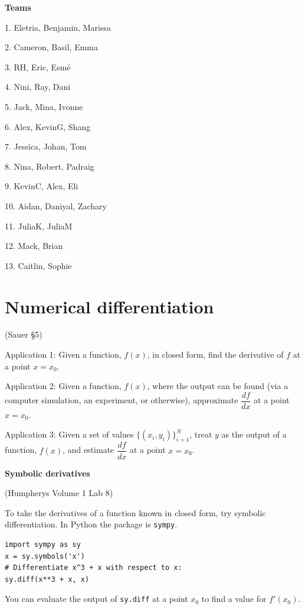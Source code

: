 \documentclass[12pt,letterpaper,noanswers]{exam}
\begin{document}
\noindent \textbf{Teams}
\begin{multicols}{3}
1. Eletria, Benjamin, Marissa

2. Cameron, Basil, Emma

3. RH, Eric, Esmé

4. Nini, Ray, Dani

5. Jack, Mina, Ivonne

6. Alex, KevinG, Shang

7. Jessica, Johan, Tom

8. Nina, Robert, Padraig

9. KevinC, Alex, Eli

10.  Aidan, Daniyal, Zachary

11. JuliaK, JuliaM

12. Mack, Brian

13. Caitlin, Sophie

\end{multicols}

\section*{Numerical differentiation}

(Sauer \S 5)

\noindent Application 1: Given a function, $f(x)$, in closed form, find the derivative of $f$ at a point $x = x_0$. 

\noindent Application 2: Given a function, $f(x)$, where the output can be found (via a computer simulation, an experiment, or otherwise), approximate $\dfrac{df}{dx}$ at a point $x = x_0$.

\noindent Application 3: Given a set of values $\{(x_i,y_i)\}_{i=1}^N$, treat $y$ as the output of a function, $f(x)$, and estimate $\dfrac{df}{dx}$ at a point $x = x_0$.

\eject

\noindent\textbf{Symbolic derivatives}
\begin{tcolorbox}

(Humpherys Volume 1 Lab 8)

To take the derivatives of a function known in closed form, try symbolic differentiation.  In Python the package is \texttt{sympy}.
\begin{verbatim}
import sympy as sy
x = sy.symbols('x')
# Differentiate x^3 + x with respect to x:
sy.diff(x**3 + x, x)
\end{verbatim}

You can evaluate the output of \texttt{sy.diff} at a point $x_0$ to find a value for $f'(x_0)$.
\end{tcolorbox}
\end{document}
